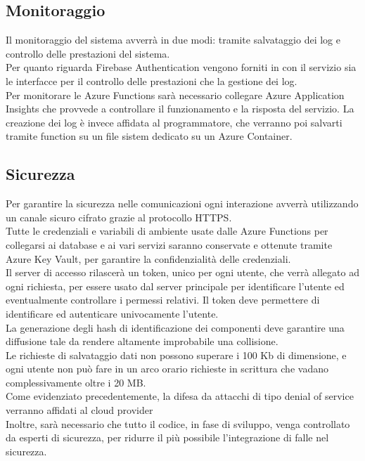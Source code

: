 \subsection{Monitoraggio}
Il monitoraggio del sistema avverrà in due modi: tramite salvataggio dei log e controllo delle prestazioni del sistema.\\
Per quanto riguarda Firebase Authentication vengono forniti in con il servizio sia le interfacce per il controllo delle prestazioni che la gestione dei log.\\
Per monitorare le Azure Functions sarà necessario collegare Azure Application Insights che provvede a controllare il funzionamento e la risposta del servizio.
La creazione dei log è invece affidata al programmatore, che verranno poi salvarti tramite function su un file sistem dedicato su un Azure Container. 

\subsection{Sicurezza}
Per garantire la sicurezza nelle comunicazioni ogni interazione avverrà utilizzando un canale sicuro cifrato grazie al protocollo HTTPS.\\
Tutte le credenziali e variabili di ambiente usate dalle Azure Functions per collegarsi ai database 
e ai vari servizi saranno conservate e ottenute tramite Azure Key Vault, per garantire la confidenzialità delle credenziali.\\
Il server di accesso rilascerà un token, unico per ogni utente, che verrà allegato ad ogni richiesta, 
per essere usato dal server principale per identificare l'utente ed eventualmente controllare i permessi relativi.
Il token deve permettere di identificare ed autenticare univocamente l'utente.\\
La generazione degli hash di identificazione dei componenti deve garantire una diffusione tale da rendere altamente improbabile una collisione.\\
Le richieste di salvataggio dati non possono superare i 100 Kb di dimensione, 
e ogni utente non può fare in un arco orario richieste in scrittura che vadano complessivamente oltre i 20 MB.\\
Come evidenziato precedentemente, la difesa da attacchi di tipo denial of service verranno affidati al cloud provider\\
Inoltre, sarà necessario che tutto il codice, in fase di sviluppo, venga controllato da esperti di sicurezza, 
per ridurre il più possibile l'integrazione di falle nel sicurezza.\\ 

